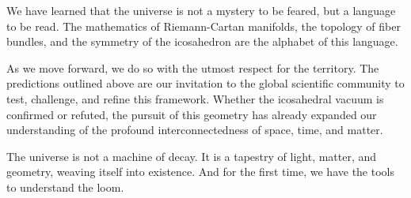 We have learned that the universe is not a mystery to be feared, but a language to be read. The mathematics of Riemann-Cartan manifolds, the topology of fiber bundles, and the symmetry of the icosahedron are the alphabet of this language. 

As we move forward, we do so with the utmost respect for the territory. The predictions outlined above are our invitation to the global scientific community to test, challenge, and refine this framework. Whether the icosahedral vacuum is confirmed or refuted, the pursuit of this geometry has already expanded our understanding of the profound interconnectedness of space, time, and matter.

The universe is not a machine of decay. It is a tapestry of light, matter, and geometry, weaving itself into existence. And for the first time, we have the tools to understand the loom.